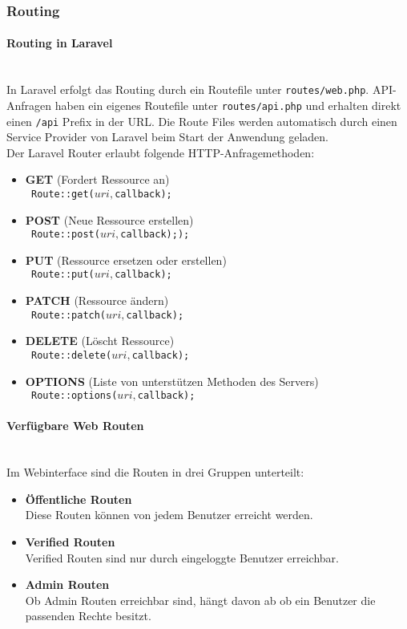 \subsubsection{Routing}

\paragraph{Routing in Laravel}\mbox{}\\
In Laravel erfolgt das Routing durch ein Routefile unter \verb|routes/web.php|. API-Anfragen
haben ein eigenes Routefile unter \verb|routes/api.php| und erhalten direkt einen
\verb|/api| Prefix in der URL. Die Route Files werden automatisch durch einen
Service Provider von Laravel beim Start der Anwendung geladen.\\

Der Laravel Router erlaubt folgende HTTP-Anfragemethoden:
\begin{itemize}
  \item \textbf{GET} (Fordert Ressource an)\\
  \texttt{  Route::get($uri, $callback);}
  \item \textbf{POST} (Neue Ressource erstellen)\\
  \texttt{  Route::post($uri, $callback););}
  \item \textbf{PUT} (Ressource ersetzen oder erstellen)\\
  \texttt{  Route::put($uri, $callback);}
  \item \textbf{PATCH} (Ressource ändern)\\
  \texttt{  Route::patch($uri, $callback);}
  \item \textbf{DELETE} (Löscht Ressource)\\
  \texttt{  Route::delete($uri, $callback);}
  \item \textbf{OPTIONS} (Liste von unterstützen Methoden des Servers)\\
  \texttt{  Route::options($uri, $callback);}
\end{itemize}

\paragraph{Verfügbare Web Routen}\mbox{}\\
Im Webinterface sind die Routen in drei Gruppen unterteilt:

\begin{itemize}
  \item \textbf{Öffentliche Routen}\\
  Diese Routen können von jedem Benutzer erreicht werden.
  \item \textbf{Verified Routen}\\
  Verified Routen sind nur durch eingeloggte Benutzer erreichbar.
  \item \textbf{Admin Routen}\\
  Ob Admin Routen erreichbar sind, hängt davon ab ob ein Benutzer die passenden
  Rechte besitzt.
\end{itemize}


